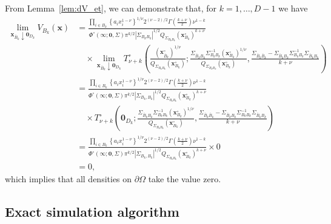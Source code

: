 \documentclass[12pt]{article}
\begin{document}
From Lemma~\ref{lem:dV_et}, we can demonstrate that, for $k = 1, \ldots, D-1$ we have 
%
\begin{align*}
\lim_{\bm x_{\bar{B}_k} \downarrow \bm 0_{D_k}} V_{B_k}(\bm x) 
&= \frac{\prod_{i\in B_k} \left\{a_i x_i^{1-\nu} \right\}^{1/\nu} 2^{(\nu-2)/2} \Gamma \left(\frac{k+\nu}{2}\right) \nu^{1-k}}{\Phi^\circ(\bm \infty;\bm 0, \Sigma) \pi^{k/2}|\Sigma_{B_kB_k}|^{1/2}Q_{\Sigma_{B_k B_k}}\left(\bm x_{B_k}^\circ\right)^{k+\nu}} \\
&\quad \times \lim_{\bm x_{\bar{B}_k} \downarrow \bm 0_{D_k}}
T^\circ_{\nu+k}\left(\frac{\left(\bm x_{\bar{B}_k}^\circ\right)^{1/\nu}}{Q_{\Sigma_{B_k B_k}}\left(\bm x_{B_k}^\circ\right)};\frac{\Sigma_{\bar{B}_k B_k}\Sigma_{B_k B_k}^{-1}\left(\bm x_{B_k}^\circ\right)^{1/\nu}}{Q_{\Sigma_{B_k B_k}}\left(\bm x_{B_k}^\circ\right)},\frac{\Sigma_{\bar{B}_k \bar{B}_k}-\Sigma_{\bar{B}_k B_k}\Sigma_{B_k B_k}^{-1}\Sigma_{\bar{B}_k B_k}}{k+\nu}\right) \\
&= \frac{\prod_{i\in B_k} \left\{a_i x_i^{1-\nu} \right\}^{1/\nu} 2^{(\nu-2)/2} \Gamma \left(\frac{k+\nu}{2}\right) \nu^{1-k}}{\Phi^\circ(\bm \infty;\bm 0, \Sigma) \pi^{k/2}|\Sigma_{B_k,B_k}|^{1/2}Q_{\Sigma_{B_k B_k}}\left(\bm x_{B_k}^\circ\right)^{k+\nu}} \\
&\quad \times T^\circ_{\nu+k}\left(\bm 0_{D_k};\frac{\Sigma_{\bar{B}_k B_k}\Sigma_{B_k B_k}^{-1}\left(\bm x_{B_k}^\circ\right)^{1/\nu}}{Q_{\Sigma_{B_k B_k}}\left(\bm x_{B_k}^\circ\right)},\frac{\Sigma_{\bar{B}_k \bar{B}_k}-\Sigma_{\bar{B}_k B_k}\Sigma_{B_k B_k}^{-1}\Sigma_{\bar{B}_k B_k}}{k+\nu}\right) \\
&= \frac{\prod_{i\in B_k} \left\{a_i x_i^{1-\nu} \right\}^{1/\nu} 2^{(\nu-2)/2} \Gamma \left(\frac{k+\nu}{2}\right) \nu^{1-k}}{\Phi^\circ(\bm \infty;\bm 0, \Sigma) \pi^{k/2}|\Sigma_{B_k,B_k}|^{1/2}Q_{\Sigma_{B_k B_k}}\left(\bm x_{B_k}^\circ\right)^{k+\nu}} \times 0 \\
&= 0,
\end{align*}
%
which implies that all densities on $\partial\Omega$ take the value zero. 

\subsection{Exact simulation algorithm}
\end{document}
